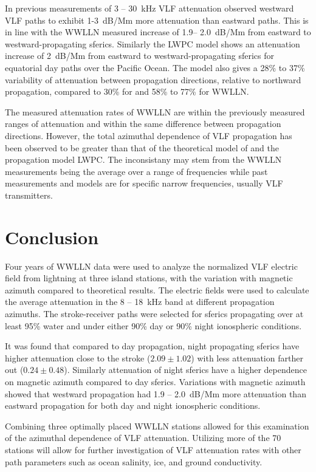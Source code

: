 In previous measurements of 3 -- 30~kHz VLF attenuation \citet{Taylor1960a} observed westward VLF paths to exhibit 1-3~dB/Mm more attenuation than eastward paths.
This is in line with the WWLLN measured increase of 1.9-- 2.0~dB/Mm from eastward to westward-propagating sferics.
Similarly the LWPC model shows an attenuation increase of 2~dB/Mm from eastward to westward-propagating sferics for equatorial day paths over the Pacific Ocean.
The model also gives a 28\% to 37\% variability of attenuation between propagation directions, relative to northward propagation, compared to 30\% for \citet{Wait1960a} and 58\% to 77\% for WWLLN.

The measured attenuation rates of WWLLN are within the previously measured ranges of attenuation and within the same difference between propagation directions.
However, the total azimuthal dependence of VLF propagation has been observed to be greater than that of the theoretical model of \citet{Wait1960} and the propagation model LWPC.
The inconsistany may stem from the WWLLN measurements being the average over a range of frequencies while past measurements and models are for specific narrow frequencies, usually VLF transmitters.

\section{Conclusion}

Four years of WWLLN data were used to analyze the normalized VLF electric field from lightning at three island stations, with the variation with magnetic azimuth compared to theoretical results.
The electric fields were used to calculate the average attenuation in the 8 -- 18~kHz band at different propagation azimuths.
The stroke-receiver paths were selected for sferics propagating over at least 95\% water and under either 90\% day or 90\% night ionospheric conditions.

It was found that compared to day propagation, night propagating sferics have higher attenuation close to the stroke ($2.09\pm1.02$) with less attenuation farther out ($0.24\pm0.48$).
Similarly attenuation of night sferics have a higher dependence on magnetic azimuth compared to day sferics.
Variations with magnetic azimuth showed that westward propagation had 1.9 -- 2.0~dB/Mm more attenuation than eastward propagation for both day and night ionospheric conditions.

Combining three optimally placed WWLLN stations allowed for this examination of the azimuthal dependence of VLF attenuation.
Utilizing more of the 70 stations will allow for further investigation of VLF attenuation rates with other path parameters such as ocean salinity, ice, and ground conductivity.
